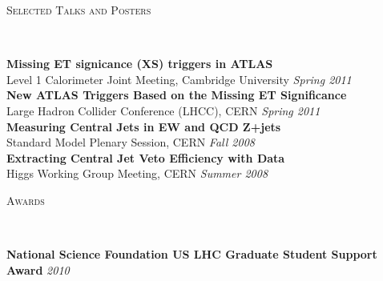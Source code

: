 \documentclass[9pt]{article}
\newenvironment{changemargin}[2]{%
  \begin{list}{}{%
    \setlength{\topsep}{0pt}%
    \setlength{\leftmargin}{#1}%
    \setlength{\rightmargin}{#2}%
    \setlength{\listparindent}{\parindent}%
    \setlength{\itemindent}{\parindent}%
    \setlength{\parsep}{\parskip}%
  }%
  \item[]}{\end{list}
}
\newcommand{\lineover}{
	\begin{changemargin}{-0.05in}{-0.05in}
		\vspace*{-8pt}
		\hrulefill \\
		\vspace*{-2pt}
	\end{changemargin}
}
\newcommand{\header}[1]{
	\begin{changemargin}{-0.5in}{-0.5in}
		\scshape{#1}\\
  	\lineover
	\end{changemargin}
}
\newenvironment{body} {
	\vspace*{-16pt}
	\begin{changemargin}{-0.25in}{-0.5in}
  }	
	{\end{changemargin}
}
\begin{document}
\begin{body}
\begin{itemize}

  \end{itemize}
\end{body}

\smallskip

\header{Selected Talks and Posters}
\begin{body}
	\vspace{14pt}
        \textbf{Missing ET signicance (XS) triggers in ATLAS} \\
        Level 1 Calorimeter Joint Meeting, Cambridge University \hfill \emph{Spring 2011} \\
        \medskip
        \textbf{New ATLAS Triggers Based on the Missing ET Significance} \\
        Large Hadron Collider Conference (LHCC), CERN \hfill \emph{Spring 2011} \\
        \medskip
        \textbf{Measuring Central Jets in EW and QCD Z+jets} \\
        Standard Model Plenary Session, CERN \hfill  \emph{Fall 2008} \\
        \medskip
        \textbf{Extracting Central Jet Veto Efficiency with Data} \\
        Higgs Working Group Meeting, CERN \hfill \emph{Summer 2008} \\

\end{body}

\smallskip


\header{Awards}
\begin{body}
  \vspace{14pt}
  \textbf{National Science Foundation US LHC Graduate Student Support Award} \hfill \emph{2010} \\
\end{body}
\end{document}

